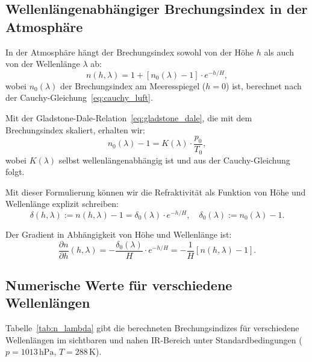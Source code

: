 \documentclass[12pt,a4paper]{article}
\providecommand{\SI}[2]{\ensuremath{#1\,#2}}
\providecommand{\hecto}{\mathrm{h}}
\providecommand{\pascal}{\mathrm{Pa}}
\providecommand{\kelvin}{\mathrm{K}}
\begin{document}
\subsection{Wellenlängenabhängiger Brechungsindex in der Atmosphäre}
\label{subsec:n_lambda_h}

In der Atmosphäre hängt der Brechungsindex sowohl von der Höhe $h$
als auch von der Wellenlänge $\lambda$ ab:
\begin{equation}
	n(h, \lambda) = 1 + [n_0(\lambda) - 1] \cdot e^{-h/H},
	\label{eq:n_lambda_h_exp}
\end{equation}
wobei $n_0(\lambda)$ der Brechungsindex am Meeresspiegel ($h = 0$) ist,
berechnet nach der Cauchy-Gleichung~\eqref{eq:cauchy_luft}.

Mit der Gladstone-Dale-Relation~\eqref{eq:gladstone_dale}, die mit dem
Brechungsindex skaliert, erhalten wir:
\begin{equation}
	n_0(\lambda) - 1 = K(\lambda) \cdot \frac{p_0}{T_0},
	\label{eq:glad_dale_lambda}
\end{equation}
wobei $K(\lambda)$ selbst wellenlängenabhängig ist und aus der Cauchy-Gleichung
folgt.

Mit dieser Formulierung können wir die Refraktivität als Funktion von
Höhe und Wellenlänge explizit schreiben:
\begin{equation}
	\delta(h, \lambda) := n(h, \lambda) - 1 = \delta_0(\lambda) \cdot e^{-h/H},
	\quad \delta_0(\lambda) := n_0(\lambda) - 1.
	\label{eq:refraktivitaet_lambda}
\end{equation}

Der Gradient in Abhängigkeit von Höhe und Wellenlänge ist:
\begin{equation}
	\frac{\partial n}{\partial h}(h, \lambda) = -\frac{\delta_0(\lambda)}{H} \cdot e^{-h/H}
	= -\frac{1}{H}[n(h, \lambda) - 1].
	\label{eq:gradient_n_lambda}
\end{equation}

\subsection{Numerische Werte für verschiedene Wellenlängen}
\label{subsec:n_zahlen}

Tabelle~\ref{tab:n_lambda} gibt die berechneten Brechungsindizes
für verschiedene Wellenlängen im sichtbaren und nahen IR-Bereich
unter Standardbedingungen ($p = \SI{1013}{\hecto\pascal}$, $T = \SI{288}{\kelvin}$).
\end{document}
